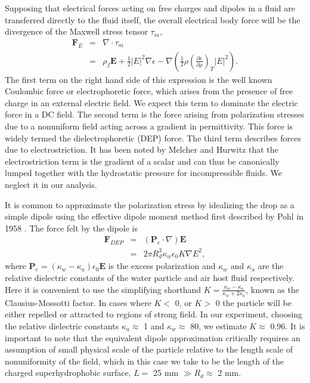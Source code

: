 \documentclass[aip,reprint, floatfix]{revtex4-1}
\begin{document}
Supposing that electrical forces acting on free charges and dipoles in a fluid are transferred directly to the fluid itself, the overall electrical body force will be the divergence of the Maxwell stress tensor $\tau_m $,
\begin{eqnarray} \label{e_force}
 \mathbf{F}_E &=& \nabla \cdot \tau_m \nonumber \\ 
 &=& \rho_f \mathbf{E} + \frac{1}{2} \left| E \right|^2 \nabla \epsilon - \nabla \left( \frac{1}{2} \rho \left( \frac{\partial \epsilon}{\partial \rho} \right)_T \left| E \right|^2 \right) .
\end{eqnarray}
The first term on the right hand side of this expression is the well known Coulombic force or electrophoretic force, which arises from the presence of free charge in an external electric field. We expect this term to dominate the electric force in a DC field. The second term is the force arising from polarization stresses due to a nonuniform field acting across a gradient in permittivity. This force is widely termed the dielectrophoretic (DEP) force. The third term describes forces due to electrostriction. It has been noted by Melcher and Hurwitz \cite{hurwitz_electrohydrodynamic_1966} that the electrostriction term is the gradient of a scalar and can thus be canonically lumped together with the hydrostatic pressure for incompressible fluids. We neglect it in our analysis. 

It is common to approximate the polarization stress by idealizing the drop as a simple dipole using the effective dipole moment method first described by Pohl in 1958 \cite{pohl_effects_1958}. The force felt by the dipole is 
\begin{eqnarray} \label{dep_force}
\mathbf{F}_{DEP} &=& \left( \mathbf{P}_e \cdot \nabla \right) \mathbf{E} \nonumber \\
&=& 2 \pi R_d^3 \kappa_w \epsilon_0 K \nabla E^2,
\end{eqnarray}
where $\mathbf{P}_e=(\kappa_w - \kappa_a)\epsilon_0 \mathbf{E}$ is the excess polarization and $\kappa_w$ and $\kappa_a$ are the relative dielectric constants of the water particle and air host fluid respectively. Here it is convenient to use the simplifying shorthand $K = \frac{\kappa_w - \kappa_a}{\kappa_w + 2 \kappa_a}$, known as the Clausius-Mossotti factor. In cases where $K <$ 0, or $K>$ 0 the particle will be either repelled or attracted to regions of strong field. In our experiment, choosing the relative dielectric constants $\kappa_a \approx$ 1 and $\kappa_w \approx$ 80, we estimate $K \approx$ 0.96. It is important to note that the equivalent dipole approximation critically requires an assumption of small physical scale of the particle relative to the length scale of nonuniformity of the field, which in this case we take to be the length of the charged superhydrophobic surface, $L =$ 25 mm $\gg R_d \approx$ 2 mm.
\end{document}
